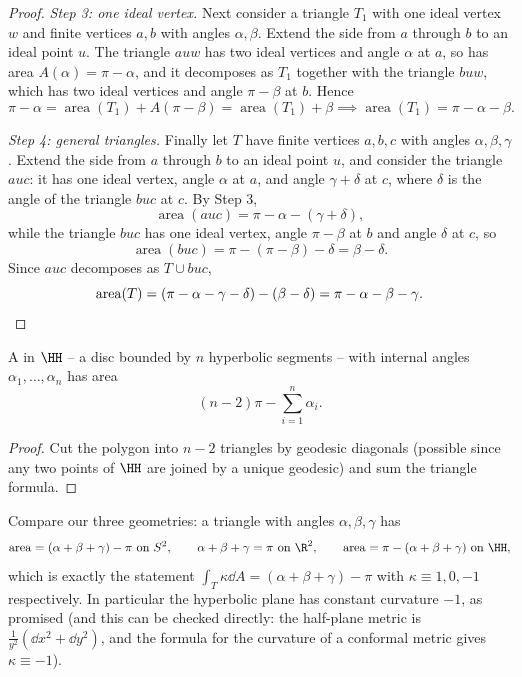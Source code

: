 \begin{proof}
    \emph{Step 3: one ideal vertex.} Next consider a triangle $T_1$ with one ideal vertex $w$ and finite vertices $a, b$ with angles $\alpha, \beta$. Extend the side from $a$ through $b$ to an ideal point $u$. The triangle $a u w$ has two ideal vertices and angle $\alpha$ at $a$, so has area $A(\alpha) = \pi - \alpha$, and it decomposes as $T_1$ together with the triangle $b u w$, which has two ideal vertices and angle $\pi - \beta$ at $b$. Hence
    $$
    \pi - \alpha = \operatorname{area}(T_1) + A(\pi - \beta) = \operatorname{area}(T_1) + \beta \implies \operatorname{area}(T_1) = \pi - \alpha - \beta.
    $$

    \emph{Step 4: general triangles.} Finally let $T$ have finite vertices $a, b, c$ with angles $\alpha, \beta, \gamma$. Extend the side from $a$ through $b$ to an ideal point $u$, and consider the triangle $a u c$: it has one ideal vertex, angle $\alpha$ at $a$, and angle $\gamma + \delta$ at $c$, where $\delta$ is the angle of the triangle $b u c$ at $c$. By Step 3,
    $$
    \operatorname{area}(auc) = \pi - \alpha - (\gamma + \delta),
    $$
    while the triangle $buc$ has one ideal vertex, angle $\pi - \beta$ at $b$ and angle $\delta$ at $c$, so
    $$
    \operatorname{area}(buc) = \pi - (\pi - \beta) - \delta = \beta - \delta.
    $$
    Since $auc$ decomposes as $T \cup buc$,
    $$
    \operatorname{area}(T) = \left(\pi - \alpha - \gamma - \delta\right) - \left(\beta - \delta\right) = \pi - \alpha - \beta - \gamma. \qedhere
    $$
\end{proof}

\begin{corollary}
    A  in $\HH$ -- a disc bounded by $n$ hyperbolic segments -- with internal angles $\alpha_1, \dots, \alpha_n$ has area
    $$
    (n - 2)\pi - \sum_{i = 1}^n \alpha_i.
    $$
\end{corollary}
\begin{proof}
    Cut the polygon into $n - 2$ triangles by geodesic diagonals (possible since any two points of $\HH$ are joined by a unique geodesic) and sum the triangle formula.
\end{proof}

Compare our three geometries: a triangle with angles $\alpha, \beta, \gamma$ has
$$
\operatorname{area} = (\alpha + \beta + \gamma) - \pi \text{ on } S^2, \qquad \alpha + \beta + \gamma = \pi \text{ on } \R^2, \qquad \operatorname{area} = \pi - (\alpha + \beta + \gamma) \text{ on } \HH,
$$
which is exactly the statement $\int_T \kappa \dd A = (\alpha + \beta + \gamma) - \pi$ with $\kappa \equiv 1, 0, -1$ respectively. In particular the hyperbolic plane has constant curvature $-1$, as promised (and this can be checked directly: the half-plane metric is $\frac{1}{y^2}(\dd x^2 + \dd y^2)$, and the formula for the curvature of a conformal metric gives $\kappa \equiv -1$).

